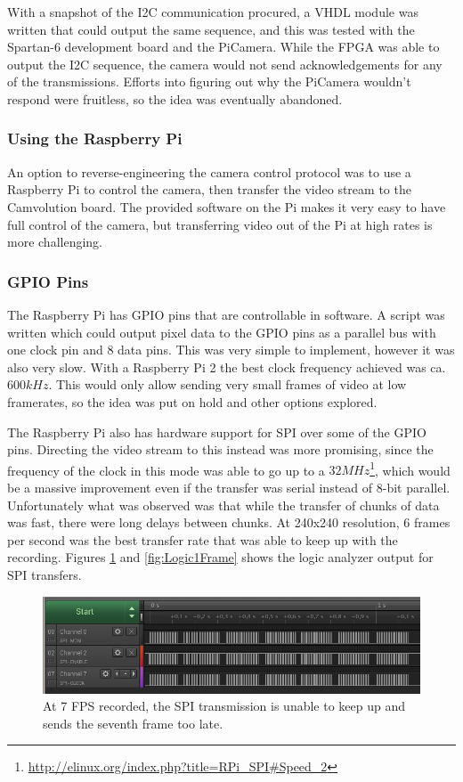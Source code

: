 With a snapshot of the I2C communication procured,
a VHDL module was written that could output the same sequence,
and this was tested with the Spartan-6 development board and the PiCamera.
While the FPGA was able to output the I2C sequence,
the camera would not send acknowledgements for any of the transmissions.
Efforts into figuring out why the PiCamera wouldn't respond were fruitless, so the idea was eventually abandoned.

\subsubsection{Using the Raspberry Pi}
An option to reverse-engineering the camera control protocol was to use a Raspberry Pi to control the camera,
then transfer the video stream to the Camvolution board.
The provided software on the Pi makes it very easy to have full control of the camera,
but transferring video out of the Pi at high rates is more challenging.

\subsubsection{GPIO Pins}
The Raspberry Pi has GPIO pins that are controllable in software.
A script was written which could output pixel data to the GPIO pins as a parallel bus with one clock pin and 8 data pins.
This was very simple to implement, however it was also very slow.
With a Raspberry Pi 2 the best clock frequency achieved was ca. $600kHz$.
This would only allow sending very small frames of video at low framerates,
so the idea was put on hold and other options explored.

The Raspberry Pi also has hardware support for SPI over some of the GPIO pins.
Directing the video stream to this instead was more promising,
since the frequency of the clock in this mode was able to go up to a $32MHz$\footnote{\url{http://elinux.org/index.php?title=RPi\_SPI\#Speed\_2}},
which would be a massive improvement even if the transfer was serial instead of 8-bit parallel.
Unfortunately what was observed was that while the transfer of chunks of data was fast,
there were long delays between chunks.
At 240x240 resolution, 6 frames per second was the best transfer rate that was able to keep up with the recording.
Figures \ref{fig:Logic7fps} and \ref{fig:Logic1Frame} shows the logic analyzer output for SPI transfers.

\begin{figure}
    \centering
    \includegraphics[width=\linewidth]{img/logic/7fps}
    \caption{At 7 FPS recorded, the SPI transmission is unable to keep up and sends the seventh frame too late.}
    \label{fig:Logic7fps}
\end{figure}

